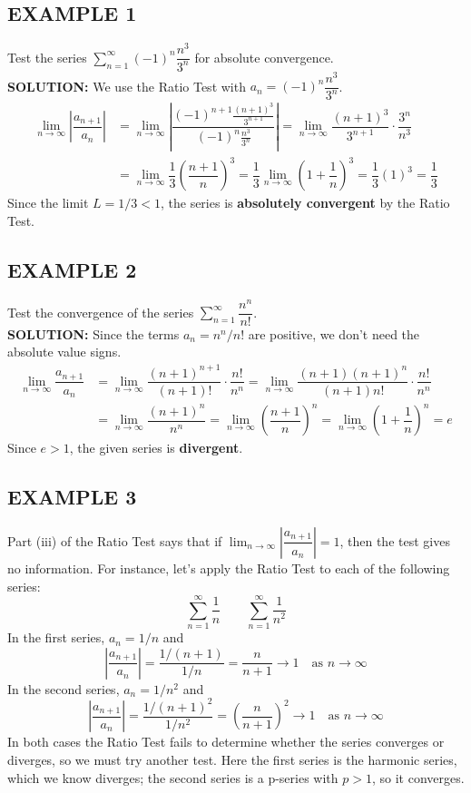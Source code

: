 \documentclass{article}
\theoremstyle{mystyle}
\begin{document}
\subsection*{EXAMPLE 1}
Test the series \( \sum_{n=1}^{\infty} (-1)^n \dfrac{n^3}{3^n} \) for absolute convergence.\\
\textbf{SOLUTION:}
We use the Ratio Test with \(a_n = (-1)^n \dfrac{n^3}{3^n}\).
\begin{align*}
    \lim_{n\to\infty} \left| \dfrac{a_{n+1}}{a_n} \right| &= \lim_{n\to\infty} \left| \dfrac{(-1)^{n+1} \frac{(n+1)^3}{3^{n+1}}}{(-1)^n \frac{n^3}{3^n}} \right| = \lim_{n\to\infty} \dfrac{(n+1)^3}{3^{n+1}} \cdot \dfrac{3^n}{n^3} \\
    &= \lim_{n\to\infty} \dfrac{1}{3} \left( \dfrac{n+1}{n} \right)^3 = \dfrac{1}{3} \lim_{n\to\infty} \left( 1 + \dfrac{1}{n} \right)^3 = \dfrac{1}{3}(1)^3 = \dfrac{1}{3}
\end{align*}
Since the limit \(L = 1/3 < 1\), the series is \textbf{absolutely convergent} by the Ratio Test.

\subsection*{EXAMPLE 2}
Test the convergence of the series \( \sum_{n=1}^{\infty} \dfrac{n^n}{n!} \).\\
\textbf{SOLUTION:}
Since the terms \(a_n = n^n/n!\) are positive, we don't need the absolute value signs.
\begin{align*}
    \lim_{n\to\infty} \dfrac{a_{n+1}}{a_n} &= \lim_{n\to\infty} \dfrac{(n+1)^{n+1}}{(n+1)!} \cdot \dfrac{n!}{n^n} = \lim_{n\to\infty} \dfrac{(n+1)(n+1)^n}{(n+1)n!} \cdot \dfrac{n!}{n^n} \\
    &= \lim_{n\to\infty} \dfrac{(n+1)^n}{n^n} = \lim_{n\to\infty} \left( \dfrac{n+1}{n} \right)^n = \lim_{n\to\infty} \left( 1 + \dfrac{1}{n} \right)^n = e
\end{align*}
Since \(e > 1\), the given series is \textbf{divergent}.

\subsection*{EXAMPLE 3}
Part (iii) of the Ratio Test says that if \( \lim_{n\to\infty} \left| \dfrac{a_{n+1}}{a_n} \right| = 1 \), then the test gives no information. For instance, let's apply the Ratio Test to each of the following series:
\[ \sum_{n=1}^{\infty} \dfrac{1}{n} \qquad \sum_{n=1}^{\infty} \dfrac{1}{n^2} \]
In the first series, \(a_n = 1/n\) and
\[ \left| \dfrac{a_{n+1}}{a_n} \right| = \dfrac{1/(n+1)}{1/n} = \dfrac{n}{n+1} \to 1 \quad \text{as } n \to \infty \]
In the second series, \(a_n = 1/n^2\) and
\[ \left| \dfrac{a_{n+1}}{a_n} \right| = \dfrac{1/(n+1)^2}{1/n^2} = \left( \dfrac{n}{n+1} \right)^2 \to 1 \quad \text{as } n \to \infty \]
In both cases the Ratio Test fails to determine whether the series converges or diverges, so we must try another test. Here the first series is the harmonic series, which we know diverges; the second series is a p-series with \(p > 1\), so it converges.
\end{document}
